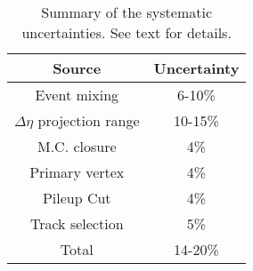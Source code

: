 \begin{table}[!h]
\centering
\caption{ Summary of the systematic uncertainties. See text for details.}
\begin{tabular}{ c|c }
\hline
Source &  Uncertainty \\ \hline
Event mixing & 6-10\% \\  \hline
$\Delta\eta$ projection range & 10-15\% \\ \hline
M.C. closure & 4\% \\ \hline
Primary vertex & 4\% \\ \hline
Pileup Cut & 4\% \\ \hline
Track selection & 5\% \\ \hline
Total & 14-20\% \\
\hline
\end{tabular}
\end{table}
\fi




